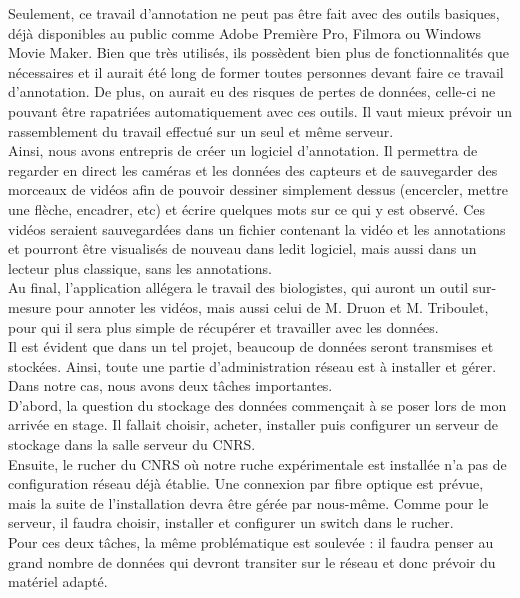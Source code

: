 \documentclass[11pt,french,a4paper]{report}
\begin{document}
Seulement, ce travail d'annotation ne peut pas être fait avec des outils basiques, déjà disponibles au public comme Adobe Première Pro, 
Filmora ou Windows Movie Maker. Bien que très utilisés, ils possèdent bien plus de fonctionnalités que nécessaires et il aurait été long
de former toutes personnes devant faire ce travail d'annotation. De plus, on aurait eu des risques de pertes de données, celle-ci
ne pouvant être rapatriées automatiquement avec ces outils. Il vaut mieux prévoir un rassemblement du travail effectué sur 
un seul et même serveur. \\

Ainsi, nous avons entrepris de créer un logiciel d'annotation. Il permettra de regarder en direct les caméras et 
les données des capteurs et de sauvegarder des morceaux de vidéos afin de pouvoir dessiner simplement dessus 
(encercler, mettre une flèche, encadrer, etc) et écrire quelques mots sur ce qui y est observé.
Ces vidéos seraient sauvegardées dans un fichier contenant la vidéo et les annotations et pourront être 
visualisés de nouveau dans ledit logiciel, mais aussi dans un lecteur plus classique, sans les annotations. \\
Au final, l'application allégera le travail des biologistes, qui auront un outil sur-mesure pour annoter les vidéos, 
mais aussi celui de M. Druon et M. Triboulet, pour qui il sera plus simple de récupérer et travailler avec les données.\\

Il est évident que dans un tel projet, beaucoup de données seront transmises et stockées. Ainsi, toute une partie d'administration 
réseau est à installer et gérer. Dans notre cas, nous avons deux tâches importantes.\\
D'abord, la question du stockage des données commençait à se poser lors de mon arrivée en stage. Il fallait choisir, acheter, installer
puis configurer un serveur de stockage dans la salle serveur du CNRS.\\
Ensuite, le rucher du CNRS où notre ruche expérimentale est installée n'a pas de configuration réseau déjà établie. 
Une connexion par fibre optique est prévue, mais la suite de l'installation devra être gérée par nous-même. Comme pour le serveur, 
il faudra choisir, installer et configurer un switch dans le rucher.\\
Pour ces deux tâches, la même problématique est soulevée : il faudra penser au grand nombre de données qui devront transiter sur le 
réseau et donc prévoir du matériel adapté.\\
\end{document}
